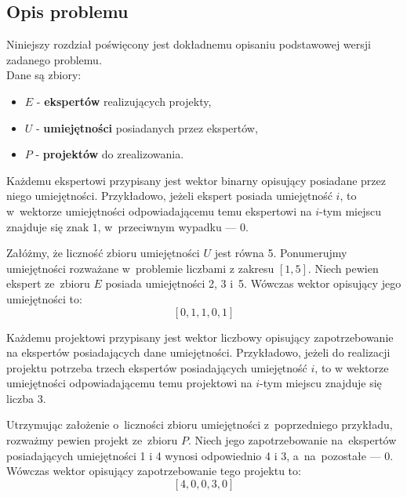\documentclass[12pt,a4paper]{article}
\theoremstyle{definition}
\begin{document}
\subsection{Opis problemu}
\label{sec:description}
Niniejszy rozdział poświęcony jest dokładnemu opisaniu podstawowej wersji zadanego problemu.\\

\noindent
Dane są zbiory:
\begin{itemize}
	\item $E$ - \textbf{ekspertów} realizujących projekty,
	\item $U$ - \textbf{umiejętności} posiadanych przez ekspertów,
	\item $P$ - \textbf{projektów} do zrealizowania.\\
\end{itemize}

\noindent
Każdemu ekspertowi przypisany jest wektor binarny opisujący posiadane przez niego umiejętności. Przykładowo, jeżeli ekspert posiada umiejętność $i$, to w~wektorze umiejętności odpowiadającemu temu ekspertowi na $i$-tym miejscu znajduje się znak $1$, w~przeciwnym wypadku --- $0$.\\

\begin{tcolorbox}[title=Przykład --- wektory ekspertów]
Załóżmy, że liczność zbioru umiejętności $U$ jest równa 5. Ponumerujmy umiejętności rozważane w~problemie liczbami z zakresu $[1, 5]$. Niech pewien ekspert ze~zbioru $E$ posiada umiejętności 2, 3 i~5. Wówczas wektor opisujący jego umiejętności to:
$$[0, 1, 1, 0, 1]$$
\end{tcolorbox}

\vspace{0.5em}
\noindent
Każdemu projektowi przypisany jest wektor liczbowy opisujący zapotrzebowanie na ekspertów posiadających dane umiejętności. Przykładowo, jeżeli do realizacji projektu potrzeba trzech ekspertów posiadających umiejętność $i$, to w wektorze umiejętności odpowiadającemu temu projektowi na $i$-tym miejscu znajduje się liczba $3$.\\

\begin{tcolorbox}[title=Przykład --- wektory zapotrzebowania projektów]
Utrzymując założenie o~liczności zbioru umiejętności z~poprzedniego przykładu, rozważmy pewien projekt ze~zbioru $P$. Niech jego zapotrzebowanie na~ekspertów posiadających umiejętności 1 i 4 wynosi odpowiednio 4 i 3, a~na~pozostałe --- 0. Wówczas wektor opisujący zapotrzebowanie tego projektu to:
$$[4, 0, 0, 3, 0]$$
\end{tcolorbox}
\end{document}
